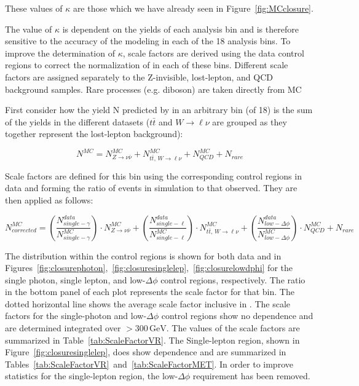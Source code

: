 These values of $\kappa$ are those which we have already seen in Figure~\ref{fig:MCclosure}.

The value of $\kappa$ is dependent on the yields of each analysis bin and is therefore sensitive to the accuracy of the modeling in each of the 18 analysis bins. To improve the determination of $\kappa$, scale factors are derived using the data control regions to correct the normalization of  in each of these bins. Different scale factors are assigned separately to the Z-invisible, lost-lepton, and QCD background  samples. Rare processes (e.g. diboson) are taken directly from MC

First consider how the yield N predicted by  in an arbitrary bin (of 18) is the sum of the yields in the different  datasets ($t\bar{t}$ and $W\rightarrow\ell\nu$ are grouped as they together represent the lost-lepton background):

\begin{equation}
N^{MC} = N_{Z\rightarrow\nu\bar{\nu}}^{MC} + N_{t\bar{t},\,W\rightarrow\ell\nu}^{MC} + N_{QCD}^{MC} + N_{rare}
\end{equation}

Scale factors are defined for this bin using the corresponding control regions in data and forming the ratio of events in simulation to that observed. They are then applied as follows:

\begin{equation}
N_{corrected}^{MC} = \left(\frac{N_{single-\gamma}^{data}}{N_{single-\gamma}^{MC}}\right) \cdot N_{Z\rightarrow\nu\bar{\nu}}^{MC} + \left(\frac{N^{data}_{single-\ell}}{N^{MC}_{single-\ell}}\right) \cdot N^{MC}_{t\bar{t},\,W\rightarrow\ell\nu} + \left(\frac{N^{data}_{low-\Delta\phi}}{N^{MC}_{low-\Delta\phi}}\right) \cdot N_{QCD}^{MC} + N_{rare}
\end{equation}

The \ptmiss distribution within the control regions is shown for both data and  in Figures~\ref{fig:closurephoton},~\ref{fig:closuresinglelep},~\ref{fig:closurelowdphi} for the single photon, single lepton, and low-$\Delta\phi$ control regions, respectively. The ratio in the bottom panel of each plot represents the scale factor for that \ptmiss bin. The dotted horizontal line shows the average scale factor inclusive in \ptmiss. The scale factors for the single-photon and low-$\Delta\phi$ control regions show no \ptmiss dependence and are determined integrated over \ptmiss$>300\,\textrm{GeV}$. The values of the scale factors are summarized in Table~\ref{tab:ScaleFactorVR}. The Single-lepton region, shown in Figure~\ref{fig:closuresinglelep}, does show \ptmiss dependence and are summarized in Tables~\ref{tab:ScaleFactorVR}~and~\ref{tab:ScaleFactorMET}.  In order to improve statistics for the single-lepton region, the low-$\Delta\phi$ requirement has been removed.

